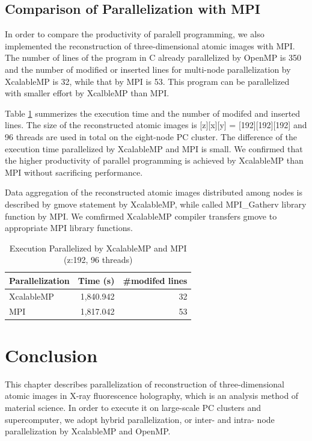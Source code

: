\documentclass[graybox,vecphys]{svmult}
\begin{document}
\subsection{Comparison of Parallelization with MPI}

In order to compare the productivity of paralell programming, we also
implemented the reconstruction of three-dimensional atomic images with
MPI. The number of lines of the program in C already parallelized by
OpenMP is 350 and the number of modified or inserted lines for
multi-node parallelization by XcalableMP is 32, while that by MPI is
53. This program can be parallelized with smaller effort by XcalbleMP
than MPI.

Table \ref{tab:xmp_mpi} summerizes the execution time and the number
of modifed and inserted lines. The size of the reconstructed atomic
images is [z][x][y] = [192][192][192] and 96 threads are used in total
on the eight-node PC cluster. The difference of the execution time
parallelized by XcalableMP and MPI is small.
We confirmed that the higher productivity of parallel programming
is achieved by XcalableMP than MPI without sacrificing performance.

Data aggregation of the reconstructed atomic images
distributed among nodes is described by gmove statement
by XcalableMP, while called MPI\_Gatherv library function
by MPI. We comfirmed XcalableMP compiler transfers gmove
to appropriate MPI library functions.

\begin{table}[t]
  \begin{center}
    \caption{Execution Parallelized by XcalableMP and MPI
      (z:192, 96 threads)}\label{tab:xmp_mpi}
  \begin{tabular}{l|r|r}\hline\hline
    Parallelization & Time (s)  & \#modifed lines\\\hline\hline
    XcalableMP      & 1,840.942 & 32\\
    MPI             & 1,817.042 & 53\\
    \hline
  \end{tabular}
  \end{center}
\end{table}

\section{Conclusion}\label{sec:conclusion}

This chapter describes parallelization of reconstruction of
three-dimensional atomic images in X-ray fluorescence holography,
which is an analysis method of material science. In order to execute
it on large-scale PC clusters and supercomputer, we adopt hybrid
parallelization, or inter- and intra- node parallelization by
XcalableMP and OpenMP.
\end{document}
